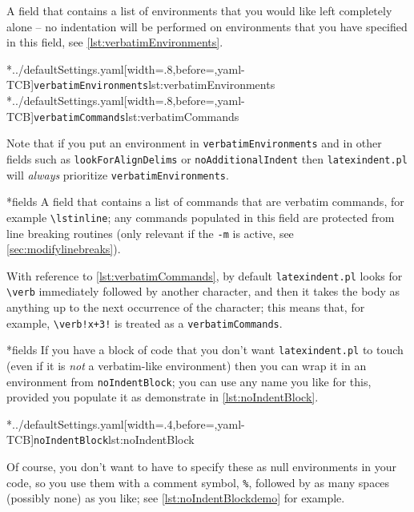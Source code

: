 	A field that contains a list of environments that you would like left completely alone --
	no indentation will be performed on environments that you have specified in this field,
	see \cref{lst:verbatimEnvironments}.

	\begin{cmhtcbraster}[raster column skip=.1\linewidth]
		\cmhlistingsfromfile[style=verbatimEnvironments]*{../defaultSettings.yaml}[width=.8\linewidth,before=\centering,yaml-TCB]{\texttt{verbatimEnvironments}}{lst:verbatimEnvironments}
		\cmhlistingsfromfile[style=verbatimCommands]*{../defaultSettings.yaml}[width=.8\linewidth,before=\centering,yaml-TCB]{\texttt{verbatimCommands}}{lst:verbatimCommands}
	\end{cmhtcbraster}

	Note that if you put an environment in	\texttt{verbatimEnvironments} and in other fields
	such as \texttt{lookForAlignDelims} or \texttt{noAdditionalIndent} then
	\texttt{latexindent.pl} will \emph{always} prioritize \texttt{verbatimEnvironments}.

*{fields}
	A field that contains a list of commands that are verbatim commands, for example
	\lstinline|\lstinline|; any commands populated in this field are protected from line
	breaking routines (only relevant if the \texttt{-m} is active, see
	\vref{sec:modifylinebreaks}).

	With reference to \cref{lst:verbatimCommands}, by default \texttt{latexindent.pl} looks
	for
	\lstinline|\verb| immediately followed by another character, and then it takes the
	body as anything up to the next occurrence of the character; this means that, for
	example, \lstinline|\verb!x+3!| is treated as a \texttt{verbatimCommands}.

*{fields}
	If you have a block of code that you don't want \texttt{latexindent.pl} to touch (even if
	 it is \emph{not} a verbatim-like environment) then you can
	wrap it in an environment from \texttt{noIndentBlock}; you can use any name you like for
	this, provided you populate it as demonstrate in \cref{lst:noIndentBlock}.

	\cmhlistingsfromfile[style=noIndentBlock]*{../defaultSettings.yaml}[width=.4\linewidth,before=\centering,yaml-TCB]{\texttt{noIndentBlock}}{lst:noIndentBlock}

	Of course, you don't want to have to specify these as null environments in your code, so
	you use them with a comment symbol, \lstinline!%!, followed by as many spaces (possibly
	none) as you like; see \cref{lst:noIndentBlockdemo} for example.

